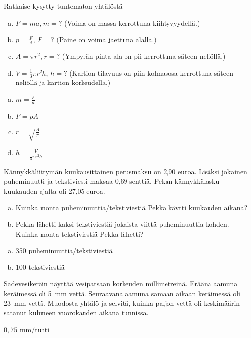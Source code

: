 \begin{tehtava}
Ratkaise kysytty tuntematon yhtälöstä
\begin{enumerate}[a)]
\item $F=ma$, $m=?$ (Voima on massa kerrottuna kiihtyvyydellä.)
\item $p=\frac{F}{A}$, $F=?$ (Paine on voima jaettuna alalla.)
\item $A=\pi r^2$, $r=?$ (Ympyrän pinta-ala on pii kerrottuna säteen neliöllä.)
\item $V=\frac{1}{3} \pi r^2 h$, $h=?$ (Kartion tilavuus on piin kolmasosa
kerrottuna säteen neliöllä ja kartion korkeudella.)
\end{enumerate}
\begin{vastaus}
\begin{enumerate}[a)]
\item $m=\frac{F}{a}$
\item $F=p A$
\item $r=\sqrt{\frac{A}{\pi}}$
\item $h=\frac{V}{ \frac{1}{3} \pi r^2 h}$
\end{enumerate}
\end{vastaus}
\end{tehtava}

\begin{tehtava}
Kännykkäliittymän kuukausittainen perusmaksu on 2,90 euroa. Lisäksi jokainen puheminuutti ja tekstiviesti maksaa 0,69 senttiä. Pekan kännykkälasku kuukauden
ajalta oli 27,05 euroa.

\begin{enumerate}[a)]
	\item Kuinka monta puheminuuttia/tekstiviestiä Pekka käytti kuukauden aikana?
	\item Pekka lähetti kaksi tekstiviestiä jokaista viittä puheminuuttia kohden. Kuinka monta tekstiviestiä Pekka lähetti?
\end{enumerate}

	\begin{vastaus}
		\begin{enumerate}[a)]
			\item 350 puheminuuttia/tekstiviestiä
			\item 100 tekstiviestiä
		\end{enumerate}
	\end{vastaus}
\end{tehtava}

\begin{tehtava}
Sadevesikeräin näyttää vesipatsaan korkeuden millimetreinä. Eräänä aamuna
keräimessä oli 5~mm vettä. Seuraavana aamuna samaan aikaan keräimessä oli 23~mm vettä. Muodosta yhtälö ja selvitä, kuinka paljon vettä oli keskimäärin satanut kuluneen vuorokauden aikana tunnissa.
	\begin{vastaus}
	$0,75$ mm/tunti
	\end{vastaus}
\end{tehtava}

